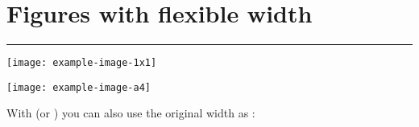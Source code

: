 \section{Figures with flexible width}

\hrule %

\texttt{[image: example-image-1x1]}

\texttt{[image: example-image-a4]}

With \texttt{\adjincludegraphics} (or \texttt{\adjustimage}) you can also use the original width as \texttt{\width}:

